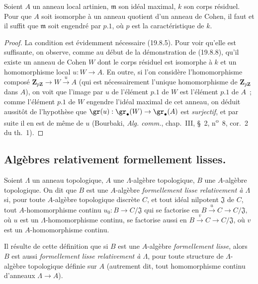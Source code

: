 \begin{proposition}[19.8.11]
\label{0.19.8.11-fr}
Soient $A$ un anneau local artinien, $\mathfrak m$ son idéal maximal, $k$ son
corps résiduel. Pour que $A$ soit isomorphe à un anneau quotient d'un anneau de
Cohen, il faut et il suffit que $\mathfrak m$ soit engendré par $p.1$, où
$p$ est la caractéristique de $k$.
\end{proposition}

\begin{proof}
La condition est évidemment nécessaire (19.8.5). Pour voir qu'elle est
suffisante, on observe, comme au début de la démonstration de (19.8.8), qu'il
existe un anneau de Cohen $W$ dont le corps résiduel est isomorphe à $k$ et un
homomorphisme local $u:W\to A$. En outre, si l'on considère l'homomorphisme
composé $\mathbf Z_{p\mathbf Z}\to W\xrightarrow{u}A$ (qui est nécessairement
l'unique homomorphisme de $\mathbf Z_{p\mathbf Z}$ dans $A$), on voit que
l'image
par $u$ de l'élément $p.1$ de $W$ est l'élément $p.1$ de $A$~; comme
l'élément $p.1$ de $W$ engendre l'idéal maximal de cet anneau, on déduit
aussitôt de l'hypothèse que
$\gr(u):\gr_\bullet(W)\to\gr_\bullet(A)$ est \emph{surjectif}, et par suite il en est
de même de $u$ (Bourbaki, \emph{Alg. comm.}, chap.~III, §~2,
n\textsuperscript{o}~8, cor.~2 du th.~1).
\end{proof}

\subsection{Algèbres relativement formellement lisses.}
\label{subsection:0.19.9-fr}

\begin{definition}[19.9.1]
\label{0.19.9.1-fr}
Soient $\Lambda$ un anneau topologique, $A$ une $\Lambda$-algèbre topologique,
$B$ une $A$-algèbre topologique. On dit que $B$ est une $A$-algèbre
\emph{formellement lisse relativement à $\Lambda$} si, pour toute $A$-algèbre
topologique discrète $C$, et tout idéal nilpotent $\mathfrak J$ de $C$, tout
$A$-homomorphisme continu $u_0:B\to C/\mathfrak J$ qui se factorise en
$B\xrightarrow{u}C\to C/\mathfrak J$, où $u$ est un \textup{$\Lambda$-homomorphisme}
continu, se factorise aussi en $B\xrightarrow{v}C\to C/\mathfrak J$, où $v$
est un \textup{$A$-homomorphisme} continu.
\end{definition}

Il résulte de cette définition que si $B$ est une $A$-algèbre \emph{formellement
lisse}, alors $B$ est aussi \emph{formellement lisse relativement à
$\Lambda$}, pour toute structure de $\Lambda$-algèbre topologique définie sur
$A$ (autrement dit, tout homomorphisme continu d'anneaux $\Lambda\to A$).

